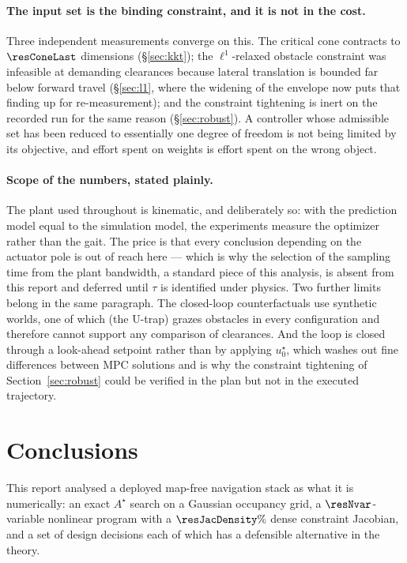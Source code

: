 \documentclass[11pt,a4paper]{article}
\newcommand{\astar}{$A^\star$}
\begin{document}
\paragraph{The input set is the binding constraint, and it is not in the cost.} Three independent
measurements converge on this. The critical cone contracts to $\resConeLast$ dimensions
(\S\ref{sec:kkt}); the $\ell^1$-relaxed obstacle constraint was infeasible at demanding clearances because
lateral translation is bounded far below forward travel (\S\ref{sec:l1}, where the widening of the envelope
now puts that finding up for re-measurement); and the constraint tightening is inert on the recorded run for
the same reason (\S\ref{sec:robust}). A controller whose admissible set has
been reduced to essentially one degree of freedom is not being limited by its objective, and effort spent on
weights is effort spent on the wrong object.

\paragraph{Scope of the numbers, stated plainly.} The plant used throughout is kinematic, and deliberately
so: with the prediction model equal to the simulation model, the experiments measure the optimizer rather
than the gait. The price is that every conclusion depending on the actuator pole is out of reach here ---
which is why the selection of the sampling time from the plant bandwidth, a standard piece of this analysis,
is absent from this report and deferred until $\tau$ is identified under physics. Two further limits belong
in the same paragraph. The closed-loop counterfactuals use synthetic worlds, one of which (the U-trap) grazes
obstacles in every configuration and therefore cannot support any comparison of clearances. And the loop is
closed through a look-ahead setpoint rather than by applying $u^\star_0$, which washes out fine differences
between MPC solutions and is why the constraint tightening of Section~\ref{sec:robust} could be verified in
the plan but not in the executed trajectory.

\section{Conclusions}
\label{sec:conclusions}

This report analysed a deployed map-free navigation stack as what it is numerically: an exact \astar{} search
on a Gaussian occupancy grid, a $\resNvar$-variable nonlinear program with a $\resJacDensity\%$ dense
constraint Jacobian, and a set of design decisions each of which has a defensible alternative in the theory.
\end{document}
